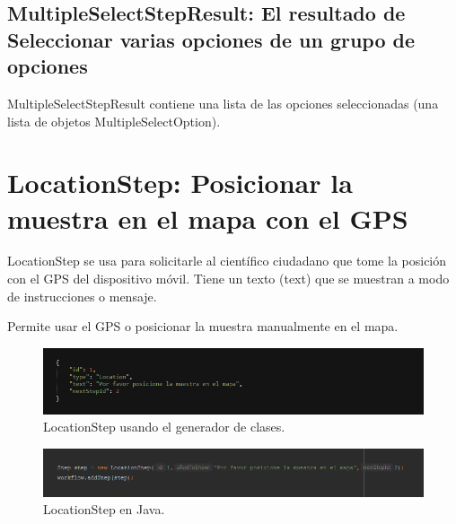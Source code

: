 \subsection{MultipleSelectStepResult: El resultado de Seleccionar varias opciones de un grupo de opciones}
MultipleSelectStepResult contiene una lista de las opciones seleccionadas (una lista de objetos MultipleSelectOption).





\section{LocationStep: Posicionar la muestra en el mapa con el GPS}
LocationStep se usa para solicitarle al científico ciudadano que tome la posición con el GPS del dispositivo móvil. Tiene un texto (text) que se muestran a modo de instrucciones o mensaje. 

Permite usar el GPS o posicionar la muestra manualmente en el mapa.

\begin{figure}[H]
  \centering
    \includegraphics[scale=0.6]{50-anexos/C-steps/location_json.png} 
    \caption{LocationStep usando el generador de clases.}
\end{figure}	

\begin{figure}[H]
  \centering
    \includegraphics[scale=0.6]{50-anexos/C-steps/location_java.png} 
    \caption{LocationStep en Java.}
\end{figure}

